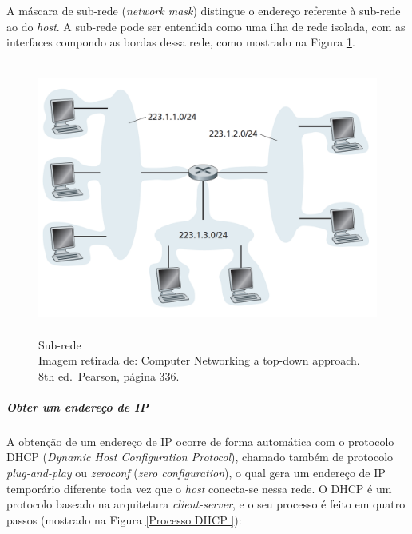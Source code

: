 A máscara de sub-rede (\emph{network mask}) distingue o endereço
referente à sub-rede ao do \emph{host}. A sub-rede pode ser entendida como
uma ilha de rede isolada, com as interfaces compondo as bordas dessa
rede, como mostrado na Figura \ref{Subrede}.


\begin{figure}[h!]
\centering
\includegraphics[keepaspectratio, width=12cm, height=9cm]{imagens/13/13 - subnet.png}
\caption{Sub-rede \\
Imagem retirada de: Computer Networking a top-down approach. 8th
ed.~Pearson, página 336. \\}
\label{Subrede}
\end{figure}





\hypertarget{obter-um-endereuxe7o-de-ip}{%
\subparagraph{Obter um endereço de
IP}\label{obter-um-endereuxe7o-de-ip}}

A obtenção de um endereço de IP ocorre de forma automática com o
protocolo DHCP (\emph{Dynamic Host Configuration Protocol}), chamado
também de protocolo \emph{plug-and-play} ou \emph{zeroconf} (\emph{zero
configuration}), o qual gera um endereço de IP temporário diferente toda
vez que o \emph{host} conecta-se nessa rede. O DHCP é um protocolo
baseado na arquitetura \emph{client-server}, e o seu processo é feito em
quatro passos (mostrado na Figura \ref{Processo DHCP }):

